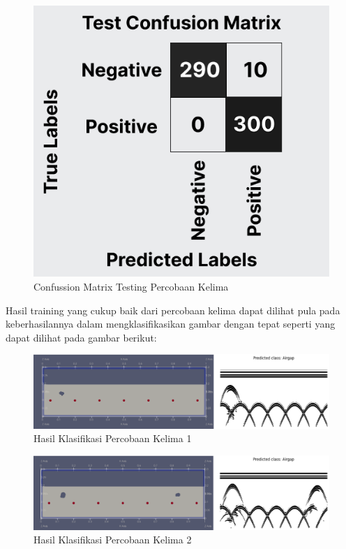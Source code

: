 \begin{figure} [H] \centering
    \includegraphics[scale=0.3]{gambar/bab4/testcon5.png}
    \caption{Confussion Matrix Testing Percobaan Kelima}
    \label{fig:testcon5}
\end{figure}

Hasil training yang cukup baik dari percobaan kelima dapat dilihat pula pada keberhasilannya dalam mengklasifikasikan gambar dengan tepat seperti yang dapat dilihat pada gambar berikut:

\begin{figure} [H] \centering
    \includegraphics[scale=0.2]{gambar/bab4/Airgap 19995.png}
    \caption{Hasil Klasifikasi Percobaan Kelima 1}
\end{figure}

\begin{figure} [H] \centering
    \includegraphics[scale=0.2]{gambar/bab4/Airgap 20005.png}
    \caption{Hasil Klasifikasi Percobaan Kelima 2}
\end{figure}

